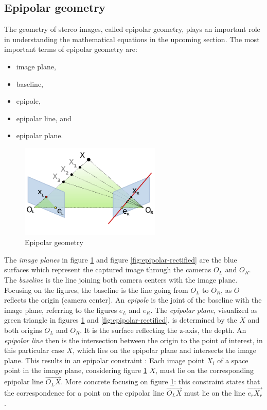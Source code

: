 \subsection*{Epipolar geometry}

The geometry of stereo images, called epipolar geometry, plays an important role in understanding the mathematical equations in the upcoming section.
The most important terms of epipolar geometry are:

\begin{itemize}
  \item image plane,
  \item baseline,
  \item epipole,
  \item epipolar line, and
  \item epipolar plane.
\end{itemize}

\begin{figure}[h!]
  \centering
  \includegraphics[width=0.6\textwidth]{src/images/epipolar.png}
  \caption[Epipolar geometry]{Epipolar geometry\protect\footnotemark}
  \label{fig:epipolar}
\end{figure}

\noindent The \textit{image planes} in figure \ref{fig:epipolar} and figure \ref{fig:epipolar-rectified} are the blue surfaces which represent the captured image through the cameras $O_L$ and $O_R$.
The \textit{baseline} is the line joining both camera centers with the image plane. Focusing on the figures, the baseline is the line going from $O_L$ to $O_R$, as $O$ reflects the origin (camera center).
An \textit{epipole} is the joint of the baseline with the image plane, referring to the figures $e_L$ and $e_R$.
The \textit{epipolar plane}, visualized as green triangle in figures \ref{fig:epipolar} and \ref{fig:epipolar-rectified}, is determined by the $X$ and both origins $O_L$ and $O_R$.
It is the surface reflecting the z-axis, the depth.
An \textit{epipolar line} then is the intersection between the origin to the point of interest, in this particular case $X$, which lies on the epipolar plane and intersects the image plane.
\newline\newline\noindent This results in an epipolar constraint \citep{cyganek2011introduction}:
Each image point $X_i$ of a space point in the image plane, considering figure \ref{fig:epipolar} $X$, must lie on the corresponding epipolar line $\vec{O_LX}$.
More concrete focusing on figure \ref{fig:epipolar}: this constraint states that the correspondence for a point on the epipolar line $\vec{O_LX}$ must lie on the line $\vec{e_rX_r}$.

